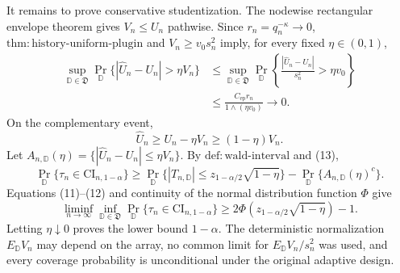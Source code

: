 It remains to prove conservative studentization. The nodewise rectangular envelope theorem gives \(V_n\le U_n\) pathwise. Since \(r_n=q_n^{-\kappa}\to0\), \(\mathrm{thm:history\text{-}uniform\text{-}plugin}\) and \(V_n\ge v_0s_n^2\) imply, for every fixed \(\eta\in(0,1)\),
\[
\begin{aligned}
\sup_{\mathbb D\in\mathfrak D}
\Pr_{\mathbb D}\{|\widehat U_n-U_n|>\eta V_n\}
&\le\sup_{\mathbb D\in\mathfrak D}
\Pr_{\mathbb D}\left\{\frac{|\widehat U_n-U_n|}{s_n^2}>\eta v_0\right\}\\
&\le\frac{C_{\mathrm{ep}}r_n}{1\wedge(\eta v_0)}\longrightarrow0.
\end{aligned}
\tag{12}
\]
On the complementary event,
\[
\widehat U_n\ge U_n-\eta V_n\ge(1-\eta)V_n.
\tag{13}
\]
Let \(A_{n,\mathbb D}(\eta)=\{|\widehat U_n-U_n|\le\eta V_n\}\). By \(\mathrm{def:wald\text{-}interval}\) and (13),
\[
\Pr_{\mathbb D}\{\tau_n\in\mathrm{CI}_{n,1-\alpha}\}
\ge\Pr_{\mathbb D}\{|T_{n,\mathbb D}|\le z_{1-\alpha/2}\sqrt{1-\eta}\}
-\Pr_{\mathbb D}\{A_{n,\mathbb D}(\eta)^c\}.
\]
Equations (11)--(12) and continuity of the normal distribution function \(\Phi\) give
\[
\liminf_{n\to\infty}\inf_{\mathbb D\in\mathfrak D}
\Pr_{\mathbb D}\{\tau_n\in\mathrm{CI}_{n,1-\alpha}\}
\ge2\Phi\!\left(z_{1-\alpha/2}\sqrt{1-\eta}\right)-1.
\tag{14}
\]
Letting \(\eta\downarrow0\) proves the lower bound \(1-\alpha\). The deterministic normalization \(E_{\mathbb D}V_n\) may depend on the array, no common limit for \(E_{\mathbb D}V_n/s_n^2\) was used, and every coverage probability is unconditional under the original adaptive design.